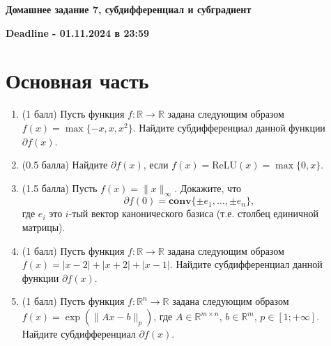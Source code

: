 \documentclass[a5paper,twoside,russian,8pt]{article}
\begin{document}
\begin{center}
    \textbf{Домашнее задание 7, субдифференциал и субградиент}
\end{center}
\begin{center}
    \textbf{Deadline - 01.11.2024 в 23:59}
\end{center}


\section*{Основная часть}
\begin{enumerate}[label=\textbf{Задача \arabic*.}]
    \item (1 балл) Пусть функция $f:\mathbb{R} \to \mathbb{R}$ задана следующим образом $f(x) = \max\{-x, x, x^2\}$. Найдите субдифференциал данной функции $\partial f(x)$.
    
    \item (0.5 балла) Найдите $\partial f(x)$, если $f(x) = \text{ReLU}(x) = \max \{0, x\}.$
    
    \item (1.5 балла) Пусть $f(x) = \|x\|_\infty$. Докажите, что $$ \partial f(0) = \textbf{conv}\{\pm e_1, \ldots , \pm e_n\}, $$ где $e_i$ это $i$-тый вектор канонического базиса (т.е. столбец единичной матрицы).
    
    \item (1 балл) Пусть функция $f:\mathbb{R} \to \mathbb{R}$ задана следующим образом $f(x) = | x - 2| + |x + 2| + |x - 1|$. Найдите субдифференциал данной функции $\partial f(x)$.
    
    \item (1 балл) Пусть функция $f: \mathbb{R}^n \to \mathbb{R}$ задана следующим образом $f(x) = \exp\left(\|Ax - b\|_p\right)$, где $A \in \mathbb{R}^{m \times n}$, $b \in \mathbb{R}^m$, $p \in [1; +\infty]$. Найдите субдифференциал $\partial f(x)$.
\end{enumerate}
\end{document}
